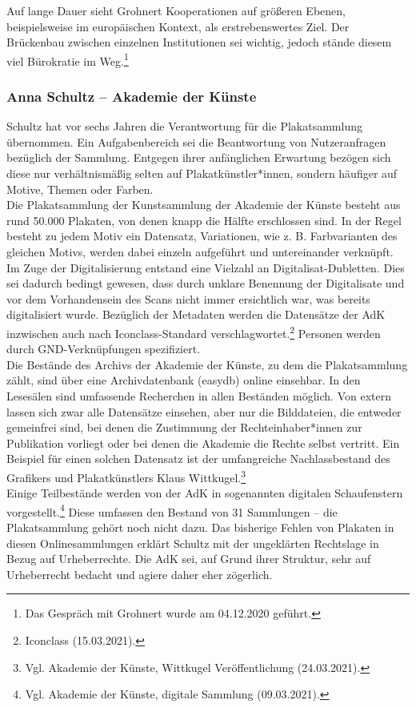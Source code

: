 \documentclass[a4paper,12pt,ngerman]{article}
\begin{document}
Auf lange Dauer sieht Grohnert Kooperationen auf größeren Ebenen, beispielsweise im europäischen Kontext, als erstrebenswertes Ziel. Der Brückenbau zwischen einzelnen Institutionen sei wichtig, jedoch stände diesem viel Bürokratie im Weg.\footnote{Das Gespräch mit Grohnert wurde am 04.12.2020 geführt.} \\

\subsubsection{Anna Schultz -- Akademie der Künste}
Schultz hat vor sechs Jahren die Verantwortung für die Plakatsammlung übernommen. Ein Aufgabenbereich sei die Beantwortung von Nutzeranfragen bezüglich der Sammlung. Entgegen ihrer anfänglichen Erwartung bezögen sich diese nur verhältnismäßig selten auf Plakatkünstler*innen, sondern häufiger auf Motive, Themen oder Farben. \\
Die Plakatsammlung der Kunstsammlung der Akademie der Künste besteht aus rund 50.000 Plakaten, von denen knapp die Hälfte erschlossen sind. In der Regel besteht zu jedem Motiv ein Datensatz, Variationen, wie z. B. Farbvarianten des gleichen Motivs, werden dabei einzeln aufgeführt und untereinander verknüpft. Im Zuge der Digitalisierung entstand eine Vielzahl an Digitalisat-Dubletten. Dies sei dadurch bedingt gewesen, dass durch unklare Benennung der Digitalisate und vor dem Vorhandensein des Scans nicht immer ersichtlich war, was bereits digitalisiert wurde. Bezüglich der Metadaten werden die Datensätze der AdK inzwischen auch nach Iconclass-Standard verschlagwortet.\footnote{Iconclass (15.03.2021).} Personen werden durch GND-Verknüpfungen spezifiziert. \\
Die Bestände des Archivs der Akademie der Künste, zu dem die Plakatsammlung zählt, sind über eine Archivdatenbank (easydb) online einsehbar. In den Lesesälen sind umfassende Recherchen in allen Beständen möglich. Von extern lassen sich zwar alle Datensätze einsehen, aber nur die Bilddateien, die entweder gemeinfrei sind, bei denen die Zustimmung der Rechteinhaber*innen zur Publikation vorliegt oder bei denen die Akademie die Rechte selbst vertritt. Ein Beispiel für einen solchen Datensatz ist der umfangreiche Nachlassbestand des Grafikers und Plakatkünstlers Klaus Wittkugel.\footnote{Vgl. Akademie der Künste, Wittkugel Veröffentlichung (24.03.2021).} \\
Einige Teilbestände werden von der AdK in sogenannten digitalen Schaufenstern vorgestellt.\footnote{Vgl. Akademie der Künste, digitale Sammlung (09.03.2021).} Diese umfassen den Bestand von 31 Sammlungen -- die Plakatsammlung gehört noch nicht dazu. Das bisherige Fehlen von Plakaten in diesen Onlinesammlungen erklärt Schultz mit der ungeklärten Rechtslage in Bezug auf Urheberrechte. Die AdK sei, auf Grund ihrer Struktur, sehr auf Urheberrecht bedacht und agiere daher eher zögerlich. \\
\end{document}
